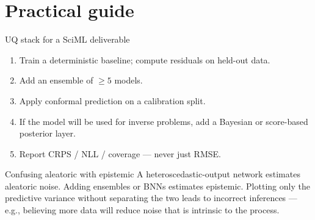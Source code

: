 \section{Practical guide}
\begin{recipe}{UQ stack for a SciML deliverable}
\begin{enumerate}
\item Train a deterministic baseline; compute residuals on held-out data.
\item Add an ensemble of $\ge 5$ models.
\item Apply conformal prediction on a calibration split.
\item If the model will be used for inverse problems, add a Bayesian
or score-based posterior layer.
\item Report CRPS / NLL / coverage --- never just RMSE.
\end{enumerate}
\end{recipe}

\begin{pitfall}{Confusing aleatoric with epistemic}
A heteroscedastic-output network estimates aleatoric noise. Adding
ensembles or BNNs estimates epistemic. Plotting only the predictive
variance without separating the two leads to incorrect inferences ---
e.g., believing more data will reduce noise that is intrinsic to the
process.
\end{pitfall}
